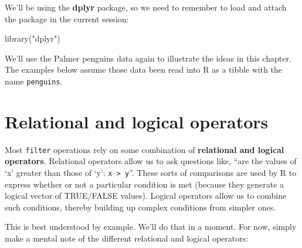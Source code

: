 \documentclass[
]{book}
\newenvironment{Shaded}{\begin{snugshade}}{\end{snugshade}}
\newcommand{\FunctionTok}[1]{\textcolor[rgb]{0.00,0.00,0.00}{#1}}
\newcommand{\NormalTok}[1]{#1}
\newcommand{\StringTok}[1]{\textcolor[rgb]{0.31,0.60,0.02}{#1}}
\begin{document}
We'll be using the \textbf{dplyr} package, so we need to remember to load and attach the package in the current session:

\begin{Shaded}
\begin{Highlighting}[]
\FunctionTok{library}\NormalTok{(}\StringTok{"dplyr"}\NormalTok{)}
\end{Highlighting}
\end{Shaded}

We'll use the Palmer penguins data again to illustrate the ideas in this chapter. The examples below assume those data been read into R as a tibble with the name \texttt{penguins}.

\hypertarget{relational-and-logical-operators}{%
\section{Relational and logical operators}\label{relational-and-logical-operators}}

Most \texttt{filter} operations rely on some combination of \textbf{relational and logical operators}. Relational operators allow us to ask questions like, ``are the values of `x' greater than those of `y': \texttt{x\ \textgreater{}\ y}''. These sorts of comparisons are used by R to express whether or not a particular condition is met (because they generate a logical vector of TRUE/FALSE values). Logical operators allow us to combine such conditions, thereby building up complex conditions from simpler ones.

This is best understood by example. We'll do that in a moment. For now, simply make a mental note of the different relational and logical operators:
\end{document}
